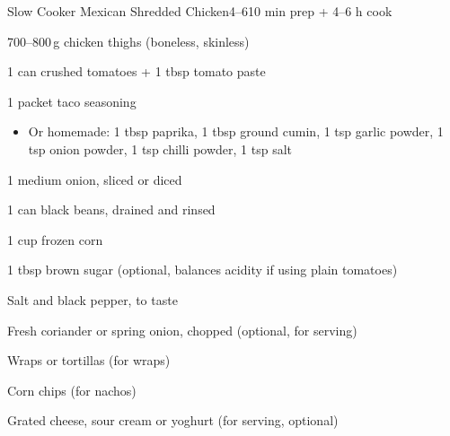 \begin{recipebox}{Slow Cooker Mexican Shredded Chicken}{4--6}{10 min prep + 4--6 h cook}
  \begin{ingredients}
    \item 700--800\,g chicken thighs (boneless, skinless)
    \item 1 can crushed tomatoes + 1 tbsp tomato paste
    \item 1 packet taco seasoning
      \begin{itemize}
        \item Or homemade: 1 tbsp paprika, 1 tbsp ground cumin,
        1 tsp garlic powder, 1 tsp onion powder,
        1 tsp chilli powder, 1 tsp salt
      \end{itemize}
    \item 1 medium onion, sliced or diced
    \item 1 can black beans, drained and rinsed
    \item 1 cup frozen corn
    \item 1 tbsp brown sugar (optional, balances acidity if using plain tomatoes)
    \item Salt and black pepper, to taste
    \item Fresh coriander or spring onion, chopped (optional, for serving)
    \item Wraps or tortillas (for wraps)
    \item Corn chips (for nachos)
    \item Grated cheese, sour cream or yoghurt (for serving, optional)
  \end{ingredients}


\end{recipebox}
